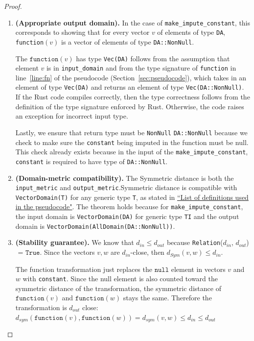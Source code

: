 \documentclass[11pt,a4paper]{article}
\newcommand{\grace}[1]{{ {\color{purple}{(grace)~#1}}}}
\newcommand{\function}{\texttt{function}}
\begin{document}
\begin{proof}
\begin{enumerate}
\item \textbf{(Appropriate output domain).} 
In the case of \texttt{make\_impute\_constant}, this corresponds to showing that for every vector $v$ of elements of type \texttt{DA}, \texttt{function}$(v)$ is a vector of elements of type \texttt{DA::NonNull}.

The $\function(v)$ has type \texttt{Vec(DA)} follows from the assumption that element $v$ is in \texttt{input\_domain} and from the type signature of \texttt{function} in line~\ref{line:fn} of the pseudocode (Section~\ref{sec:pseudocode}), which takes in an element of type \texttt{Vec(DA)} and returns an element of type \texttt{Vec(DA::NonNull)}. If the Rust code compiles correctly, then the type correctness follows from the definition of the type signature enforced by Rust. Otherwise, the code raises an exception for incorrect input type. 

Lastly, we ensure that return type must be \texttt{NonNull} \grace{Attribute? Property? Carrier} \texttt{DA::NonNull} because we check to make sure the \texttt{constant} being imputed in the function must be null. \grace{Not sure if this needs to be explicit in the pseudo code with the error check, or if I can just cite some trait property.} This check already exists because in the input of the \texttt{make\_impute\_constant}, \texttt{constant} is required to have type of \texttt{DA::NonNull}.

\item \textbf{(Domain-metric compatibility).} The Symmetric distance is both the \texttt{input\_metric} and \texttt{output\_metric}.Symmetric distance is compatible with \texttt{VectorDomain(T)} for any generic type \texttt{T}, as stated in \href{https://www.overleaf.com/project/60d215bf90b337ac02200a99}{``List of definitions used in the pseudocode"}. The theorem holds because for \texttt{make\_impute\_constant}, the input domain is \texttt{VectorDomain(DA)} for generic type \texttt{TI} and the output domain is \texttt{VectorDomain(AllDomain(DA::NonNull))}. 

\item \textbf{(Stability guarantee).}     We know that $d_{in} \leq d_{out}$ because \texttt{Relation}($d_{in}$, $d_{out}$) $\texttt{ = True}$. Since the vectors $v, w$ are $d_{in}$-close, then $d_{Sym}(v, w) \leq d_{in}$.
    
    The function transformation just replaces the $\texttt{null}$ element in vectors $v$ and $w$ with \texttt{constant}. Since the null element is also counted toward the symmetric distance of the transformation, the symmetric distance of $\texttt{function}(v)$ and $\texttt{function}(w)$ stays the same. Therefore the transformation is $d_{out}$ close: $d_{sym}(\texttt{function}(v), \texttt{function}(w)) = d_{sym}(v, w) \leq d_{in} \leq d_{out}$

\end{enumerate}
\end{proof}
\end{document}
